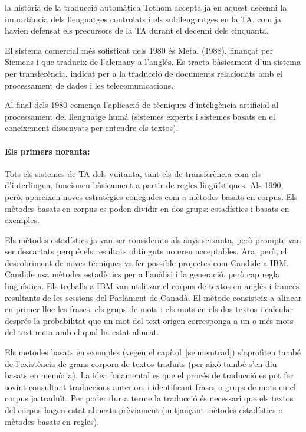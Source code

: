 \begin{persabermes}{la història de la traducció automàtica}
Tothom accepta ja en aquest decenni la importància dels llenguatges
controlats i els subllenguatges en la TA, com ja havien defensat els
precursors de la TA durant el decenni dels cinquanta.

El sistema comercial més sofisticat dels 1980 és Metal (1988),
finançat per Siemens i que tradueix de l'alemany a l'anglés.  Es
tracta bàsicament d'un sistema per transferència, indicat per a la
traducció de documents relacionats amb el processament de dades i les
telecomunicacions.

Al final dels 1980 comença l'aplicació de tècniques d'inteligència
artificial al processament del llenguatge humà (sistemes experts i
sistemes basats en el coneixement dissenyats per entendre els textos).

\paragraph{Els primers noranta:} Tots els sistemes de TA dels
vuitanta, tant els de transferència com els d'interlingua, funcionen
bàsicament a partir de regles lingüístiques. Als 1990, però, apareixen
noves estratègies conegudes com a mètodes basats en corpus. Els
mètodes basats en corpus es poden dividir en dos grups: estadístics i
basats en exemples.

Els mètodes estadístics ja van ser considerats als anys seixanta, però
prompte van ser descartats perquè els resultats obtinguts no eren
acceptables. Ara, però, el descobriment de noves tècniques va fer
possible projectes com Candide a IBM. Candide usa mètodes estadístics
per a l'anàlisi i la generació, però cap regla lingüística. Els
treballs a IBM van utilitzar el corpus de textos en anglés i francés
resultants de les sessions del Parlament de Canadà.  El mètode
consisteix a alinear en primer lloc les frases, els grups de mots i
els mots en els dos textos i calcular després la probabilitat que un
mot del text origen corresponga a un o més mots del text meta amb el
qual ha estat alineat.

Els metodes basats en exemples (vegeu el capítol~\ref{se:memtrad})
s'aprofiten també de l'existència de grans corpora de textos
traduïts (per això també s'en diu basats en memòria). La idea
fonamental es que el procés de traducció es pot fer sovint consultant
traduccions anteriors i identificant frases o grups de mots en el
corpus ja traduït. Per poder dur a terme la traducció és necessari que
els textos del corpus hagen estat alineats prèviament (mitjançant
mètodes estadístics o mètodes basats en regles).


\end{persabermes}
